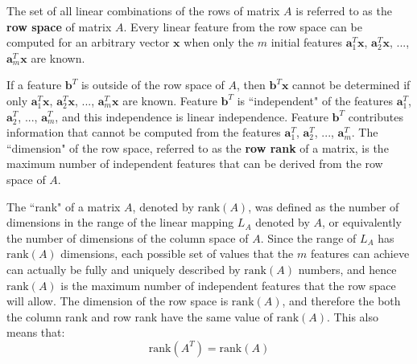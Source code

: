 \documentclass{article}
\begin{document}
\vspace{5mm}

The set of all linear combinations of the rows of matrix \(A\) is referred to as the {\bf row space} of matrix \(A\). Every linear feature from the row space can be computed for an arbitrary vector \(\mathbf{x}\) when only the \(m\) initial features \(\mathbf{a}_1^T\mathbf{x}\), \(\mathbf{a}_2^T\mathbf{x}\), ..., \(\mathbf{a}_m^T\mathbf{x}\) are known.   

\vspace{5mm}

If a feature \(\mathbf{b}^T\) is outside of the row space of \(A\), then \(\mathbf{b}^T\mathbf{x}\) cannot be determined if only \(\mathbf{a}_1^T\mathbf{x}\), \(\mathbf{a}_2^T\mathbf{x}\), ..., \(\mathbf{a}_m^T\mathbf{x}\) are known. Feature \(\mathbf{b}^T\) is ``independent" of the features \(\mathbf{a}_1^T\), \(\mathbf{a}_2^T\), ..., \(\mathbf{a}_m^T\), and this independence is linear independence. Feature \(\mathbf{b}^T\) contributes information that cannot be computed from the features \(\mathbf{a}_1^T\), \(\mathbf{a}_2^T\), ..., \(\mathbf{a}_m^T\). The ``dimension" of the row space, referred to as the {\bf row rank} of a matrix, is the maximum number of independent features that can be derived from the row space of \(A\).

\vspace{5mm}

The ``rank" of a matrix \(A\), denoted by \(\text{rank}(A)\), was defined as the number of dimensions in the range of the linear mapping \(L_A\) denoted by \(A\), or equivalently the number of dimensions of the column space of \(A\). Since the range of \(L_A\) has \(\text{rank}(A)\) dimensions, each possible set of values that the \(m\) features can achieve can actually be fully and uniquely described by \(\text{rank}(A)\) numbers, and hence \(\text{rank}(A)\) is the maximum number of independent features that the row space will allow. The dimension of the row space is \(\text{rank}(A)\), and therefore the both the column rank and row rank have the same value of \(\text{rank}(A)\). This also means that:
\[\text{rank}(A^T) = \text{rank}(A)\]

\vspace{5mm}
\end{document}
